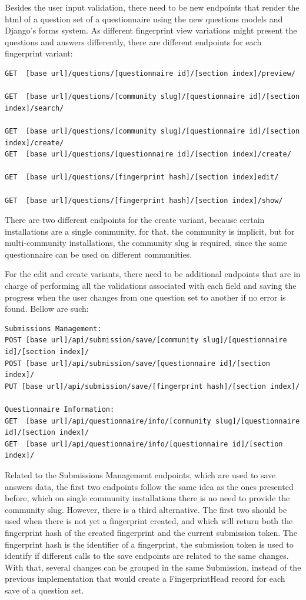 Besides the user input validation, there need to be new endpoints that render the \gls{html} of a question set of a questionnaire using the new questions models and Django's forms system.
As different fingerprint view variations might present the questions and answers differently, there are different endpoints for each fingerprint variant:

\begin{lstlisting}[basicstyle=\tiny]
GET  [base url]/questions/[questionnaire id]/[section index]/preview/

GET  [base url]/questions/[community slug]/[questionnaire id]/[section index]/search/

GET  [base url]/questions/[community slug]/[questionnaire id]/[section index]/create/
GET  [base url]/questions/[questionnaire id]/[section index]/create/

GET  [base url]/questions/[fingerprint hash]/[section index]edit/

GET  [base url]/questions/[fingerprint hash]/[section index]/show/
\end{lstlisting}

There are two different endpoints for the create variant, because certain installations are a single community, for that, the community is implicit, but for multi-community installations, the community slug is required, since the same questionnaire can be used on different communities.

For the edit and create variants, there need to be additional endpoints that are in charge of performing all the validations associated with each field and saving the progress when the user changes from one question set to another if no error is found.
Bellow are such:

\begin{lstlisting}[basicstyle=\scriptsize]
Submissions Management:
POST [base url]/api/submission/save/[community slug]/[questionnaire id]/[section index]/
POST [base url]/api/submission/save/[questionnaire id]/[section index]/
PUT [base url]/api/submission/save/[fingerprint hash]/[section index]/

Questionnaire Information:
GET  [base url]/api/questionnaire/info/[community slug]/[questionnaire id]/[section index]/
GET  [base url]/api/questionnaire/info/[questionnaire id]/[section index]/
\end{lstlisting}

Related to the Submissions Management endpoints, which are used to save answers data, the first two endpoints follow the same idea as the ones presented before, which on single community installations there is no need to provide the community slug.
However, there is a third alternative.
The first two should be used when there is not yet a fingerprint created, and which will return both the fingerprint hash of the created fingerprint and the current submission token.
The fingerprint hash is the identifier of a fingerprint, the submission token is used to identify if different calls to the save endpoints are related to the same changes.
With that, several changes can be grouped in the same Submission, instead of the previous implementation that would create a FingerprintHead record for each save of a question set.

